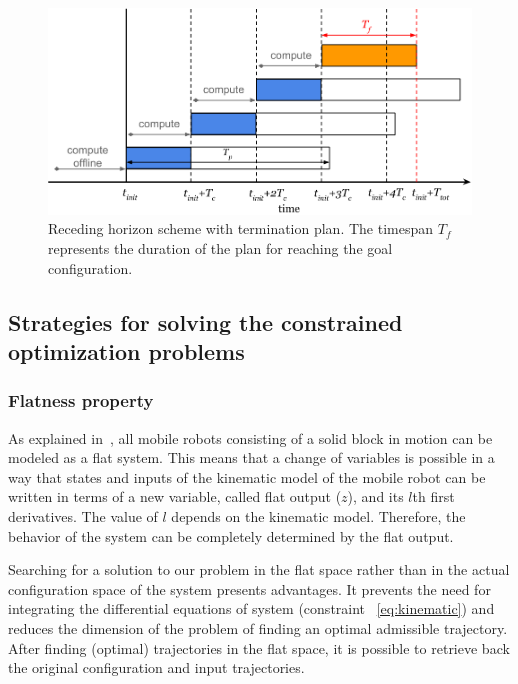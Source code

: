 \documentclass[eprint]{actapoly}
\begin{document}
\begin{figure}[!h]
  \centering
  \includegraphics[width=\linewidth]{./images/receding_horizon/recedinghorizon2.png} %
  \caption{Receding horizon scheme with termination plan. The timespan $T_f$ represents the duration of the plan for reaching the goal configuration.\label{fig:recedinghor}}
\end{figure}



\subsection{Strategies for solving the constrained optimization problems}



\subsubsection{Flatness property}

As explained in~\cite{Defoort2007a}, all mobile robots consisting of a solid
block in motion can be modeled as a flat system. 
This means that a change of variables is possible in a way that states and
inputs of the kinematic model of the mobile robot can be written in terms
of a new variable, called flat output ($z$), and its $l$th first derivatives.
The value of $l$ depends on the kinematic model.
Therefore, the behavior of the system can be completely determined by the flat
output.


Searching for a solution to our problem in the flat space rather than in
the actual configuration space of the system presents advantages.
It prevents the need for integrating the differential equations
of system (constraint ~\ref{eq:kinematic}) and reduces the dimension of the 
problem of finding an optimal admissible trajectory.
After finding (optimal) trajectories in the flat space, it is possible
to retrieve back the original configuration and input trajectories.
\end{document}
